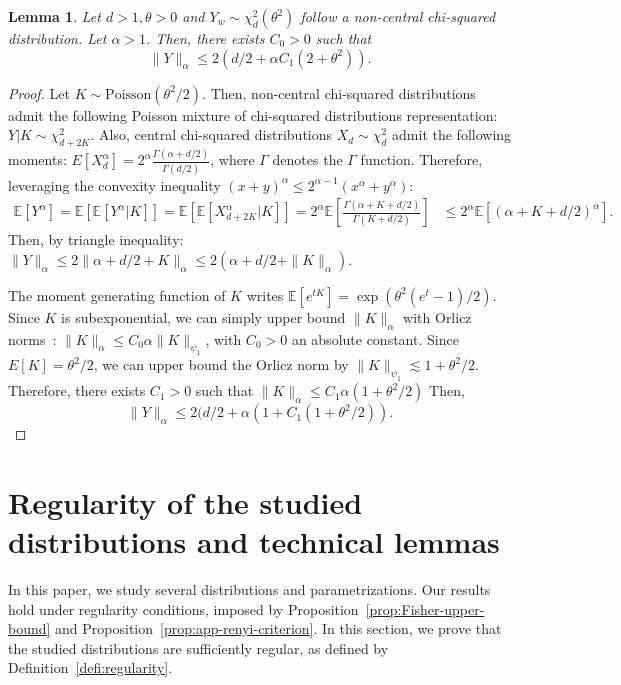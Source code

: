 \documentclass{article}
\theoremstyle{plain}
\newtheorem{lemma}{Lemma}[section]
\theoremstyle{definition}
\theoremstyle{remark}
\begin{document}
\begin{lemma}
\label{lem:chi-2-moments}
    Let $d > 1, \theta > 0$ and $Y_w \sim \chi_d^2(\theta^2)$ follow a non-central chi-squared distribution. Let $\alpha > 1$. Then, there exists $C_0 > 0$ such that
    \[\|Y\|_\alpha \leq 2(d/2 + \alpha C_1(2+ \theta^2)).\]
\end{lemma}

\begin{proof}
    Let $K \sim \text{Poisson}(\theta^2/2)$. Then, non-central chi-squared distributions admit the following Poisson mixture of chi-squared distributions representation: $Y | K \sim\chi_{d+2K}^2$. Also, central chi-squared distributions $X_d \sim \chi_d^2$ admit the following moments: $E[X_d^\alpha] = 2^\alpha \frac{\Gamma(\alpha + d/2)}{\Gamma(d/2)}$, where $\Gamma$ denotes the $\Gamma$ function.
    Therefore, leveraging the convexity inequality $(x+y)^\alpha \leq 2^{\alpha-1} (x^\alpha + y^\alpha)$:
    \begin{align*}
        \mathbb{E}[Y^\alpha] = \mathbb{E}[\mathbb{E}[Y^\alpha | K]] = \mathbb{E}\left[\mathbb{E}[X_{d + 2K}^\alpha|K]\right] = 2^\alpha\mathbb{E}\left[\frac{\Gamma(\alpha + K + d/2)}{\Gamma(K + d/2)}\right] &\leq 2^\alpha\mathbb{E}\left[(\alpha + K + d/2)^\alpha\right].
    \end{align*}
    Then, by triangle inequality: $\|Y\|_\alpha \leq 2 \| \alpha + d/2 + K\|_\alpha \leq 2(\alpha + d/2 + \|K\|_\alpha)$.
    
    The moment generating function of $K$ writes $\mathbb{E}[e^{tK}] = \exp(\theta^2 (e^t-1)/2)$. Since $K$ is subexponential, we can simply upper bound $\|K\|_\alpha $ with Orlicz norms~\citep{Vershynin2018}: $\|K\|_\alpha \leq C_0 \alpha \|K\|_{\psi_1}$, with $C_0 > 0$ an absolute constant. Since $E[K] = \theta^2/2$, we can upper bound the Orlicz norm by $\|K\|_{\psi_1} \lesssim 1+\theta^2/2$.  Therefore, there exists $C_1 > 0$ such that $\|K\|_\alpha \leq C_1 \alpha (1+\theta^2/2)$
    Then,
    \[\|Y\|_\alpha \leq 2(d/2 + \alpha (1+ C_1(1+ \theta^2/2)).\]
\end{proof}


\newpage
\section{Regularity of the studied distributions and technical lemmas}

In this paper, we study several distributions and parametrizations. Our results hold under regularity conditions, imposed by Proposition~\ref{prop:Fisher-upper-bound} and Proposition~\ref{prop:app-renyi-criterion}. In this section, we prove that the studied distributions are sufficiently regular, as defined by Definition~\ref{defi:regularity}.
\end{document}
